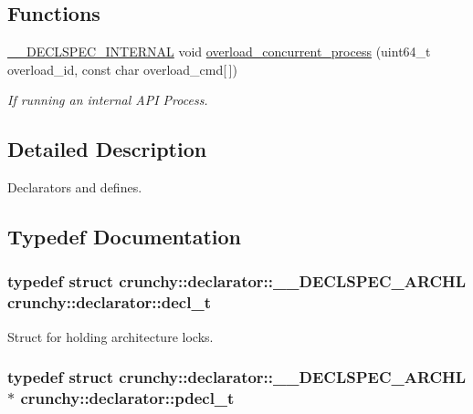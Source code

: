 \subsection*{Functions}
\begin{DoxyCompactItemize}
\item 
\hyperlink{_declspec_8h_add2c9e5146b4eb6fdda70423049d29a4}{\+\_\+\+\_\+\+D\+E\+C\+L\+S\+P\+E\+C\+\_\+\+I\+N\+T\+E\+R\+N\+A\+L} void \hyperlink{namespacecrunchy_1_1declarator_a99b90638be455e5c536be8e8fd1fc535}{overload\+\_\+concurrent\+\_\+process} (uint64\+\_\+t overload\+\_\+id, const char overload\+\_\+cmd\mbox{[}$\,$\mbox{]})
\begin{DoxyCompactList}\small\item\em If running an internal A\+P\+I Process. \end{DoxyCompactList}\end{DoxyCompactItemize}


\subsection{Detailed Description}
Declarators and defines. 

\subsection{Typedef Documentation}
\hypertarget{namespacecrunchy_1_1declarator_a0f9bbabe1552349f0ee0ae228ed30bb2}{}
\subsubsection[{decl\+\_\+t}]{\setlength{\rightskip}{0pt plus 5cm}typedef struct {\bf crunchy\+::declarator\+::\+\_\+\+\_\+\+D\+E\+C\+L\+S\+P\+E\+C\+\_\+\+A\+R\+C\+H\+L}  {\bf crunchy\+::declarator\+::decl\+\_\+t}}\label{namespacecrunchy_1_1declarator_a0f9bbabe1552349f0ee0ae228ed30bb2}


Struct for holding architecture locks. 

\hypertarget{namespacecrunchy_1_1declarator_a518adbd030268ca7f676cfe5c5ee7624}{}
\subsubsection[{pdecl\+\_\+t}]{\setlength{\rightskip}{0pt plus 5cm}typedef struct {\bf crunchy\+::declarator\+::\+\_\+\+\_\+\+D\+E\+C\+L\+S\+P\+E\+C\+\_\+\+A\+R\+C\+H\+L} $\ast$ {\bf crunchy\+::declarator\+::pdecl\+\_\+t}}\label{namespacecrunchy_1_1declarator_a518adbd030268ca7f676cfe5c5ee7624}


